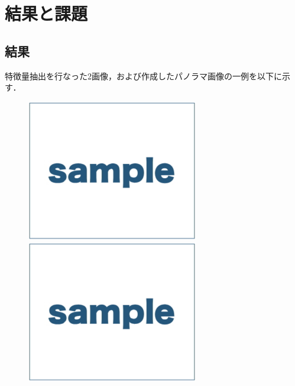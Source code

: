 \section{結果と課題}

\subsection{結果}
特徴量抽出を行なった2画像，および作成したパノラマ画像の一例を以下に示す．

\begin{figure}[H]
    \begin{minipage}{0.5\hsize}
        \begin{center}
            \includegraphics[width=75mm]{./figures/section_2/sample.eps}
        \end{center}
    \end{minipage}
    \begin{minipage}{0.5\hsize}
        \begin{center}
            \includegraphics[width=75mm]{./figures/section_2/sample.eps}
        \end{center}
    \end{minipage}
\end{figure}
